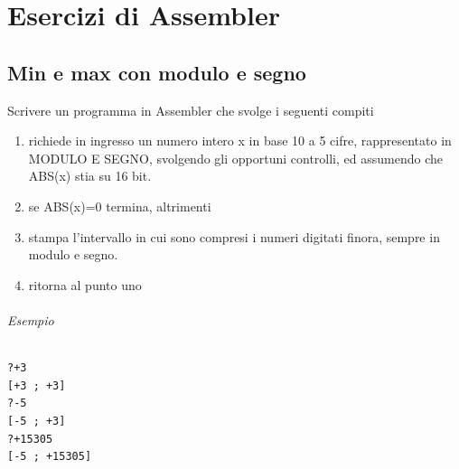 \documentclass[11pt]{report}
\begin{document}
\part{Esercizi di Assembler}








\chapter{Min e max con modulo e segno}
Scrivere un programma in Assembler che svolge i seguenti compiti
\begin{enumerate}
\item richiede in ingresso un numero intero x in base 10 a 5 cifre, rappresentato in MODULO E SEGNO, svolgendo gli opportuni controlli, ed assumendo che ABS(x) stia su 16 bit.
\item se ABS(x)=0 termina, altrimenti
\item stampa l'intervallo in cui sono compresi i numeri digitati finora, sempre in modulo e segno.
\item ritorna al punto uno
\end{enumerate}
\paragraph{Esempio}
\begin{verbatim}
?+3
[+3 ; +3]
?-5
[-5 ; +3]
?+15305
[-5 ; +15305]
\end{verbatim}

\end{document}
